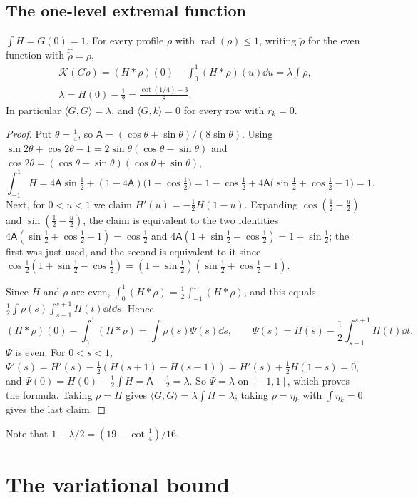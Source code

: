 \documentclass[11pt,colorlinks]{charlie}
\newcommand{\rad}{\operatorname{rad}}
\newcommand{\Ka}{\mathcal{K}}
\begin{document}
\subsection{The one-level extremal function}
\begin{lemma}\label{lem:extremal}
$\int H=G(0)=1$. For every profile $\rho$ with $\rad(\rho)\le1$, writing $\check\rho$ for the even function with $\widehat{\check\rho}=\rho$,
\begin{gather*}
 \Ka(G\check\rho)=(H*\rho)(0)-\int_0^1(H*\rho)(u)\dd u=\lambda\int\rho,\\
 \lambda=H(0)-\frac12=\frac{\cot(1/4)-3}8 .
\end{gather*}
In particular $\langle G,G\rangle=\lambda$, and $\langle G,k\rangle=0$ for every row with $r_k=0$.
\end{lemma}
\begin{proof}
Put $\theta=\frac14$, so $\mathsf A=(\cos\theta+\sin\theta)/(8\sin\theta)$. Using $\sin2\theta+\cos2\theta-1=2\sin\theta(\cos\theta-\sin\theta)$ and $\cos2\theta=(\cos\theta-\sin\theta)(\cos\theta+\sin\theta)$,
\[
 \int_{-1}^1H=4\mathsf A\sin\tfrac12+(1-4\mathsf A)\big(1-\cos\tfrac12\big)=1-\cos\tfrac12+4\mathsf A\big(\sin\tfrac12+\cos\tfrac12-1\big)=1 .
\]
Next, for $0<u<1$ we claim $H'(u)=-\frac12H(1-u)$. Expanding $\cos(\frac12-\frac u2)$ and $\sin(\frac12-\frac u2)$, the claim is equivalent to the two identities $4\mathsf A(\sin\frac12+\cos\frac12-1)=\cos\frac12$ and $4\mathsf A(1+\sin\frac12-\cos\frac12)=1+\sin\frac12$; the first was just used, and the second is equivalent to it since $\cos\frac12(1+\sin\frac12-\cos\frac12)=(1+\sin\frac12)(\sin\frac12+\cos\frac12-1)$.

Since $H$ and $\rho$ are even, $\int_0^1(H*\rho)=\frac12\int_{-1}^1(H*\rho)$, and this equals $\frac12\int\rho(s)\int_{s-1}^{s+1}H(t)\dd t\dd s$. Hence
\[
 (H*\rho)(0)-\int_0^1(H*\rho)=\int\rho(s)\Psi(s)\dd s,\qquad\Psi(s)=H(s)-\frac12\int_{s-1}^{s+1}H(t)\dd t .
\]
$\Psi$ is even. For $0<s<1$, $\Psi'(s)=H'(s)-\frac12(H(s+1)-H(s-1))=H'(s)+\frac12H(1-s)=0$, and $\Psi(0)=H(0)-\frac12\int H=\mathsf A-\frac12=\lambda$. So $\Psi=\lambda$ on $[-1,1]$, which proves the formula. Taking $\rho=H$ gives $\langle G,G\rangle=\lambda\int H=\lambda$; taking $\rho=\eta_k$ with $\int\eta_k=0$ gives the last claim.
\end{proof}

Note that $1-\lambda/2=(19-\cot\frac14)/16$.

\section{The variational bound}\label{sec:principle}
\end{document}
